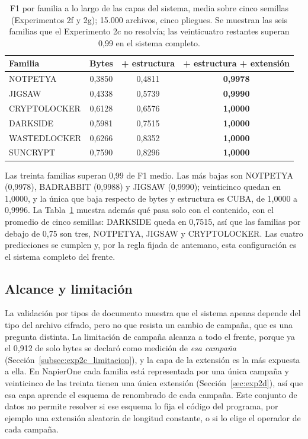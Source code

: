 \begin{table}[ht]
\centering
\caption{F1 por familia a lo largo de las capas del sistema, media sobre cinco semillas (Experimentos 2f y 2g); 15.000 archivos, cinco pliegues. Se muestran las seis familias que el Experimento 2c no resolvía; las veinticuatro restantes superan 0,99 en el sistema completo.}
\label{tab:exp2g_familias}
\begin{tabular}{|l|c|c|c|}
\hline
\textbf{Familia} & \textbf{Bytes} & \textbf{+ estructura} & \textbf{+ estructura + extensión} \\
\hline
NOTPETYA & 0,3850 & 0,4811 & \textbf{0,9978} \\
JIGSAW & 0,4338 & 0,5739 & \textbf{0,9990} \\
CRYPTOLOCKER & 0,6128 & 0,6576 & \textbf{1,0000} \\
DARKSIDE & 0,5981 & 0,7515 & \textbf{1,0000} \\
WASTEDLOCKER & 0,6266 & 0,8352 & \textbf{1,0000} \\
SUNCRYPT & 0,7590 & 0,8296 & \textbf{1,0000} \\
\hline
\end{tabular}
\end{table}

Las treinta familias superan 0,99 de F1 medio. Las más bajas son NOTPETYA (0,9978), BADRABBIT (0,9988) y JIGSAW (0,9990); veinticinco quedan en 1,0000, y la única que baja respecto de bytes y estructura es CUBA, de 1,0000 a 0,9996. La Tabla~\ref{tab:exp2g_familias} muestra además qué pasa solo con el contenido, con el promedio de cinco semillas: DARKSIDE queda en 0,7515, así que las familias por debajo de 0,75 son tres, NOTPETYA, JIGSAW y CRYPTOLOCKER. Las cuatro predicciones se cumplen y, por la regla fijada de antemano, esta configuración es el sistema completo del frente.

\subsection{Alcance y limitación}

La validación por tipos de documento muestra que el sistema apenas depende del tipo del archivo cifrado, pero no que resista un cambio de campaña, que es una pregunta distinta. La limitación de campaña alcanza a todo el frente, porque ya el 0,912 de solo bytes se declaró como medición de \textit{esa campaña} (Sección~\ref{subsec:exp2c_limitacion}), y la capa de la extensión es la más expuesta a ella. En NapierOne cada familia está representada por una única campaña y veinticinco de las treinta tienen una única extensión (Sección~\ref{sec:exp2d}), así que esa capa aprende el esquema de renombrado de cada campaña. Este conjunto de datos no permite resolver si ese esquema lo fija el código del programa, por ejemplo una extensión aleatoria de longitud constante, o si lo elige el operador de cada campaña.

